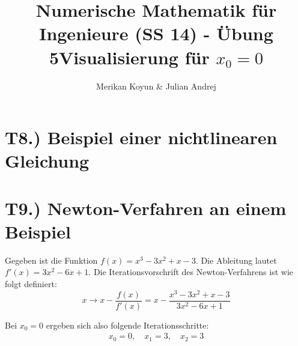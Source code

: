 \documentclass[11pt]{article}
\theoremstyle{plain}
\theoremstyle{definition}
\renewcommand{\u}{\"{u}}
\begin{document}
\title{Numerische Mathematik f\u r Ingenieure (SS 14) - \"{U}bung 5}
\author{Merikan Koyun \& Julian Andrej}
\maketitle

\section*{T8.) Beispiel einer nichtlinearen Gleichung}


\section*{T9.) Newton-Verfahren an einem Beispiel}
Gegeben ist die Funktion $f(x)=x^3 - 3x^2 + x -3$. Die Ableitung lautet $f'(x)=3x^2 - 6x+1$. Die Iterationsvorschrift des Newton-Verfahrens ist wie folgt definiert:
\begin{equation}
x \rightarrow x - \dfrac{f(x)}{f'(x)} = x - \dfrac{x^3 - 3x^2 + x -3}{3x^2 - 6x+1}
\end{equation}

Bei $x_0=0$ ergeben sich also folgende Iterationsschritte:
\begin{align*}
x_0 = 0, \quad x_1 = 3, \quad x_2 = 3 
\end{align*}

\begin{figure}[!ht]
\centering
{}

\title{Visualisierung f\u r $x_0=0$}
\end{figure}
\end{document}
